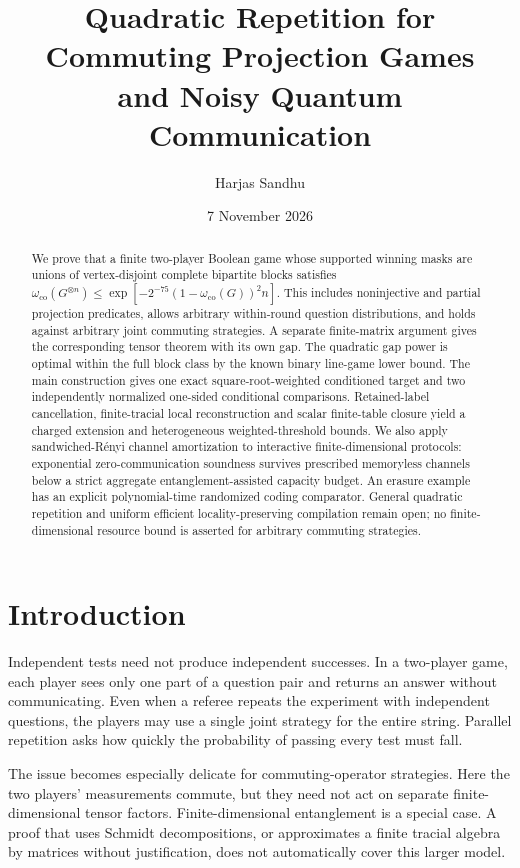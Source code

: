 \documentclass[11pt,reqno]{amsart}
\title[Quadratic repetition for commuting games]{Quadratic Repetition for Commuting Projection Games\\and Noisy Quantum Communication}
\author{Harjas Sandhu}
\date{7 November 2026}
\numberwithin{equation}{section}
\begin{document}
\raggedbottom
\begin{abstract}
We prove that a finite two-player Boolean game whose supported winning masks are unions of vertex-disjoint complete bipartite blocks satisfies
\(\omega_{\mathrm{co}}(G^{\otimes n})\le
\exp[-2^{-75}(1-\omega_{\mathrm{co}}(G))^2n]\).
This includes noninjective and partial projection predicates, allows arbitrary within-round question distributions, and holds against arbitrary joint commuting strategies. A separate finite-matrix argument gives the corresponding tensor theorem with its own gap. The quadratic gap power is optimal within the full block class by the known binary line-game lower bound. The main construction gives one exact square-root-weighted conditioned target and two independently normalized one-sided conditional comparisons. Retained-label cancellation, finite-tracial local reconstruction and scalar finite-table closure yield a charged extension and heterogeneous weighted-threshold bounds. We also apply sandwiched-Rényi channel amortization to interactive finite-dimensional protocols: exponential zero-communication soundness survives prescribed memoryless channels below a strict aggregate entanglement-assisted capacity budget. An erasure example has an explicit polynomial-time randomized coding comparator. General quadratic repetition and uniform efficient locality-preserving compilation remain open; no finite-dimensional resource bound is asserted for arbitrary commuting strategies.
\end{abstract}
\maketitle

\section{Introduction}\label{introduction}

Independent tests need not produce independent successes. In a two-player game, each player sees only one part of a question pair and returns an answer without communicating. Even when a referee repeats the experiment with independent questions, the players may use a single joint strategy for the entire string. Parallel repetition asks how quickly the probability of passing every test must fall.

The issue becomes especially delicate for commuting-operator strategies. Here the two players' measurements commute, but they need not act on separate finite-dimensional tensor factors. Finite-dimensional entanglement is a special case. A proof that uses Schmidt decompositions, or approximates a finite tracial algebra by matrices without justification, does not automatically cover this larger model.
\end{document}
